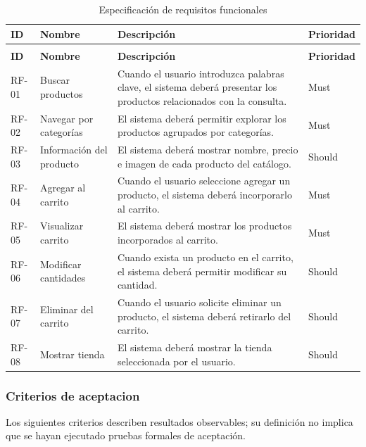 \documentclass[12pt,a4paper]{article}
\renewcommand{\arraystretch}{1.17}
\begin{document}
\begingroup
\footnotesize
\setlength{\tabcolsep}{3pt}
\renewcommand{\arraystretch}{1.22}
\begin{longtable}{|>{\raggedright\arraybackslash}p{1.35cm}|>{\raggedright\arraybackslash}p{2.8cm}|>{\raggedright\arraybackslash}p{8.3cm}|>{\raggedright\arraybackslash}p{1.5cm}|}
\caption{Especificación de requisitos funcionales}\\
\hline
\textbf{ID} & \textbf{Nombre} & \textbf{Descripción} & \textbf{Prioridad} \\
\hline
\endfirsthead
\multicolumn{4}{c}{\textit{Continuación: Especificación de requisitos funcionales}}\\
\hline
\textbf{ID} & \textbf{Nombre} & \textbf{Descripción} & \textbf{Prioridad} \\
\hline
\endhead
RF-01 & Buscar productos & Cuando el usuario introduzca palabras clave, el sistema deberá presentar los productos relacionados con la consulta. & Must \\
\hline
RF-02 & Navegar por categorías & El sistema deberá permitir explorar los productos agrupados por categorías. & Must \\
\hline
RF-03 & Información del producto & El sistema deberá mostrar nombre, precio e imagen de cada producto del catálogo. & Should \\
\hline
RF-04 & Agregar al carrito & Cuando el usuario seleccione agregar un producto, el sistema deberá incorporarlo al carrito. & Must \\
\hline
RF-05 & Visualizar carrito & El sistema deberá mostrar los productos incorporados al carrito. & Must \\
\hline
RF-06 & Modificar cantidades & Cuando exista un producto en el carrito, el sistema deberá permitir modificar su cantidad. & Should \\
\hline
RF-07 & Eliminar del carrito & Cuando el usuario solicite eliminar un producto, el sistema deberá retirarlo del carrito. & Should \\
\hline
RF-08 & Mostrar tienda & El sistema deberá mostrar la tienda seleccionada por el usuario. & Should \\
\hline
\end{longtable}
\endgroup

\subsubsection{Criterios de aceptacion}
Los siguientes criterios describen resultados observables; su definición no implica que se hayan ejecutado pruebas formales de aceptación.
\end{document}
